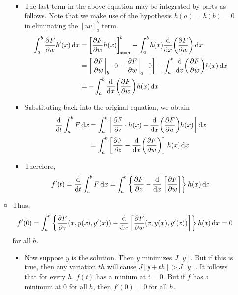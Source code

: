 \documentclass[../notes.tex]{subfiles}
\begin{document}
\begin{itemize}
\begin{itemize}
\begin{align*}
        \end{align*}
        \begin{itemize}
            \item The last term in the above equation may be integrated by parts as follows. Note that we make use of the hypothesis $h(a)=h(b)=0$ in eliminating the $[uv]_a^b$ term.
            \begin{align*}
                \int_a^b\pdv{F}{w}h'(x)\dd{x} &= \left[ \pdv{F}{w}h(x) \right]_{x=a}^b-\int_a^bh(x)\dv{x}(\pdv{F}{w})\dd{x}\\
                &= \left[ \eval{\pdv{F}{w}}_b\cdot 0-\eval{\pdv{F}{w}}_a\cdot 0 \right]-\int_a^b\dv{x}(\pdv{F}{w})h(x)\dd{x}\\
                &= -\int_a^b\dv{x}(\pdv{F}{w})h(x)\dd{x}
            \end{align*}
            \item Substituting back into the original equation, we obtain
            \begin{align*}
                \dv{t}\int_a^bF\dd{x} &= \int_a^b\left[ \pdv{F}{z}\cdot h(x)-\dv{x}(\pdv{F}{w})h(x) \right]\dd{x}\\
                &= \int_a^b\left[ \pdv{F}{z}-\dv{x}(\pdv{F}{w}) \right]h(x)\dd{x}
            \end{align*}
            \item Therefore,
            \begin{equation*}
                f'(t) = \dv{t}\int_a^bF\dd{x}
                = \int_a^b\left\{ \pdv{F}{z}(x,y(x)+th(x),y'(x)+th'(x))-\dv{x}\left[ \pdv{F}{w}(x,y(x)+th(x),y'(x)+th'(x)) \right] \right\}h(x)\dd{x}
            \end{equation*}
        \end{itemize}
        \item Thus,
        \begin{equation*}
            f'(0) = \int_a^b\left\{ {\pdv{F}{z}}(x,y(x),y'(x))-\dv{x}\left[ {\pdv{F}{w}}(x,y(x),y'(x)) \right] \right\}h(x)\dd{x}
            = 0
        \end{equation*}
        for all $h$.
        \begin{itemize}
            \item Now suppose $y$ is the solution. Then $y$ minimizes $J[y]$. But if this is true, then any variation $th$ will cause $J[y+th]>J[y]$. It follows that for every $h$, $f(t)$ has a minium at $t=0$. But if $f$ has a minimum at 0 for all $h$, then $f'(0)=0$ for all $h$.

\end{itemize}
\end{itemize}
\end{itemize}
\end{document}

